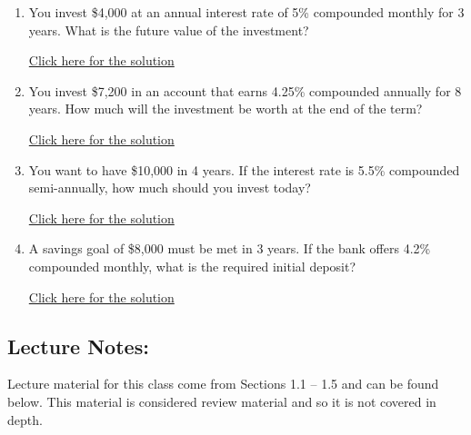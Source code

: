 \documentclass[
]{book}
\providecommand{\tightlist}{%
  \setlength{\itemsep}{0pt}\setlength{\parskip}{0pt}}
\begin{document}
\begin{enumerate}
\def\labelenumi{\arabic{enumi}.}
\tightlist
\item
  You invest \$4,000 at an annual interest rate of 5\% compounded monthly for 3 years. What is the future value of the investment?

  \href{https://youtu.be/Csdbw7AIGSA}{Click here for the solution}
\item
  You invest \$7,200 in an account that earns 4.25\% compounded annually for 8 years. How much will the investment be worth at the end of the term?

  \href{https://youtu.be/4vo1QE6fmXE}{Click here for the solution}
\item
  You want to have \$10,000 in 4 years. If the interest rate is 5.5\% compounded semi-annually, how much should you invest today?

  \href{https://youtu.be/AZg71adyIfo}{Click here for the solution}
\item
  A savings goal of \$8,000 must be met in 3 years. If the bank offers 4.2\% compounded monthly, what is the required initial deposit?

  \href{https://youtu.be/hCXRx8LGUe4}{Click here for the solution}
\end{enumerate}

\subsection*{Lecture Notes:}\label{lecture-notes-10}

Lecture material for this class come from Sections 1.1 -- 1.5 and can be found below. This material is considered review material and so it is not covered in depth.
\end{document}

